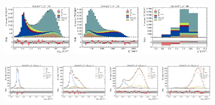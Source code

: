 \begin{figure}[htb]
    \centering
    \includegraphics[width=0.32\textwidth]{./figs-fit-fit-results/ctrl-fit/stacked/fit_result-stacked-Dst-dd-mmiss2.pdf}
    \includegraphics[width=0.32\textwidth]{./figs-fit-fit-results/ctrl-fit/stacked/fit_result-stacked-Dst-dd-el.pdf}
    \includegraphics[width=0.32\textwidth]{./figs-fit-fit-results/ctrl-fit/stacked/fit_result-stacked-Dst-dd-q2.pdf}

    \includegraphics[width=0.24\textwidth]{./figs-fit-fit-results/ctrl-fit/lines_q2_slices/fit_result-lines_q2_idx1-Dst-dd-mmiss2.pdf}
    \includegraphics[width=0.24\textwidth]{./figs-fit-fit-results/ctrl-fit/lines_q2_slices/fit_result-lines_q2_idx2-Dst-dd-mmiss2.pdf}
    \includegraphics[width=0.24\textwidth]{./figs-fit-fit-results/ctrl-fit/lines_q2_slices/fit_result-lines_q2_idx3-Dst-dd-mmiss2.pdf}
    \includegraphics[width=0.24\textwidth]{./figs-fit-fit-results/ctrl-fit/lines_q2_slices/fit_result-lines_q2_idx4-Dst-dd-mmiss2.pdf}


\end{figure}
